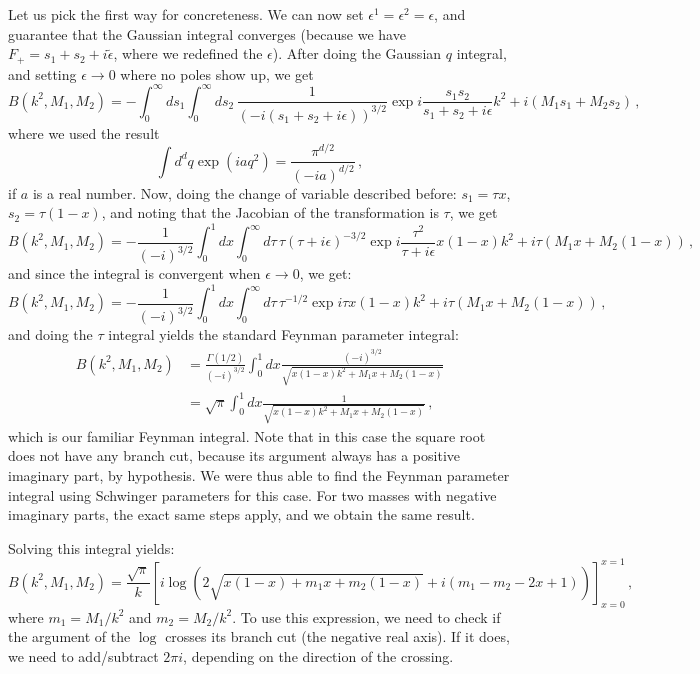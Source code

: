 \documentclass[twoside]{article}
\begin{document}
Let us pick the first way for concreteness.
We can now set $\epsilon^1=\epsilon^2=\epsilon$, and guarantee that the Gaussian integral converges (because we have $F_+ = s_1 + s_2 + i \tilde{\epsilon}$, where we redefined the $\epsilon$).
After doing the Gaussian $q$ integral, and setting $\epsilon \to 0$ where no poles show up, we get
\begin{equation}
B(k^2,M_1,M_2)= - \int_0^\infty ds_1 \int_0^\infty ds_2\,\frac{1}{(- i(s_1+s_2+ i \epsilon))^{3/2}} \exp{i\frac{s_1 s_2}{s_1+s_2+i\epsilon}k^2+ i (M_1 s_1 +M_2 s_2)}\,,
\end{equation}
where we used the result
\begin{equation}
\label{eq:gauss}
\int d^d q \exp(i a q^2) = \frac{\pi^{d/2}}{(-i a)^{d/2}}\,,
\end{equation}
if $a$ is a real number.
Now, doing the change of variable described before: $s_1 = \tau x$, $s_2 = \tau (1-x)$, and noting that the Jacobian of the transformation is $\tau$, we get
\begin{equation}
B(k^2,M_1,M_2)= - \frac{1}{(- i)^{3/2}} \int_0^1 dx \int_0^\infty d\tau\, \tau (\tau+i \epsilon)^{-3/2}  \exp{i \frac{\tau^2}{\tau+i \epsilon} x (1-x)k^2+ i \tau (M_1 x +M_2 (1-x))}\,,
\end{equation}
and since the integral is convergent when $\epsilon \to 0$, we get:
\begin{equation}
B(k^2,M_1,M_2)= - \frac{1}{(- i)^{3/2}} \int_0^1 dx \int_0^\infty d\tau\, \tau^{-1/2}  \exp{i \tau x (1-x)k^2+ i \tau (M_1 x +M_2 (1-x))}\,,
\end{equation}
and doing the $\tau$ integral yields the standard Feynman parameter integral:
\begin{align}
B(k^2,M_1,M_2)&= \frac{\Gamma(1/2)}{(- i)^{3/2}} \int_0^1 dx \frac{(-i)^{3/2}}{\sqrt{x (1-x)k^2+ M_1 x +M_2 (1-x)}}\\
& = \sqrt{\pi}\int_0^1 dx \frac{1}{\sqrt{x (1-x)k^2+ M_1 x +M_2 (1-x)}} \,, \label{eq:Bsame}
\end{align}
which is our familiar Feynman integral.  
Note that in this case the square root does not have any branch cut, because its argument always has a positive imaginary part, by hypothesis. We were thus able to find the Feynman parameter integral using Schwinger parameters for this case. For two masses with negative imaginary parts, the exact same steps apply, and we obtain the same result.

Solving this integral yields:
\begin{equation}
B(k^2,M_1,M_2) =\frac{\sqrt{\pi}}{k} \left[ i \log \left(2 \sqrt{x (1-x) + m_1 x + m_2 (1-x)}+i (m_1-m_2-2 x+1)\right)\right]_{x=0}^{x=1} \,,
\end{equation}
where $m_1 = M_1/k^2$ and $m_2 = M_2/k^2$. To use this expression, we need to check if the argument of the $\log$ crosses its branch cut (the negative real axis). If it does, we need to add/subtract $2 \pi i$, depending on the direction of the crossing.
\end{document}
